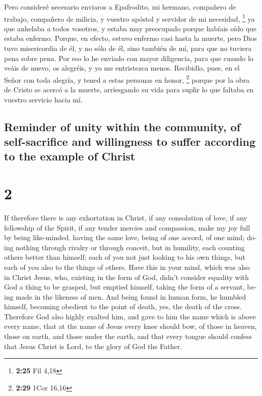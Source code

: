 \begin{paracol}{2}
 Pero consideré necesario enviaros a Epafrodito, mi
hermano, compañero de trabajo, compañero de milicia, y vuestro apóstol y
servidor de mi necesidad, \footnote{\textbf{2:25} Fil 4,18}
 ya que anhelaba a todos vosotros, y estaba muy
preocupado porque habíais oído que estaba enfermo. 
Porque, en efecto, estuvo enfermo casi hasta la muerte, pero Dios tuvo
misericordia de él, y no sólo de él, sino también de mí, para que no
tuviera pena sobre pena.  Por eso lo he enviado con mayor
diligencia, para que cuando lo veáis de nuevo, os alegréis, y yo me
entristezca menos.  Recibidlo, pues, en el Señor con toda
alegría, y tened a estas personas en honor, \footnote{\textbf{2:29} 1Cor
  16,16}  porque por la obra de Cristo se acercó a la
muerte, arriesgando su vida para suplir lo que faltaba en vuestro
servicio hacia mí.

\switchcolumn
\begin{otherlanguage}{english}

\hypertarget{reminder-of-unity-within-the-community-of-self-sacrifice-and-willingness-to-suffer-according-to-the-example-of-christ}{%
\subsection{Reminder of unity within the community, of self-sacrifice
and willingness to suffer according to the example of
Christ}\label{reminder-of-unity-within-the-community-of-self-sacrifice-and-willingness-to-suffer-according-to-the-example-of-christ}}

\hypertarget{section-3}{%
\section{2}\label{section-3}}

 If therefore there is any exhortation in Christ, if any
consolation of love, if any fellowship of the Spirit, if any tender
mercies and compassion,  make my joy full by being
like-minded, having the same love, being of one accord, of one mind;
 doing nothing through rivalry or through conceit, but in
humility, each counting others better than himself;  each
of you not just looking to his own things, but each of you also to the
things of others.  Have this in your mind, which was also
in Christ Jesus,  who, existing in the form of God, didn't
consider equality with God a thing to be grasped,  but
emptied himself, taking the form of a servant, being made in the
likeness of men.  And being found in human form, he
humbled himself, becoming obedient to the point of death, yes, the death
of the cross.  Therefore God also highly exalted him, and
gave to him the name which is above every name,  that at
the name of Jesus every knee should bow, of those in heaven, those on
earth, and those under the earth,  and that every tongue
should confess that Jesus Christ is Lord, to the glory of God the
Father.


\end{otherlanguage}
\end{paracol}
